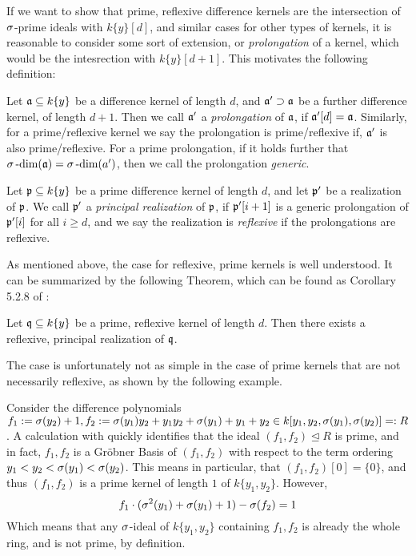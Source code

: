 If we want to show that prime, reflexive difference kernels are the intersection of $\sigma$-prime ideals with $k\{y\}[d]$, and similar cases for other types of kernels,
it is reasonable to consider some sort of extension, or \emph{prolongation} of a kernel, which would be the intesrection with $k\{y\}[d+1]$.  
This motivates the following definition: 

\begin{defn}
Let $\mathfrak{a} \subseteq k\{y\}$ be a difference kernel of length $d$, and $\mathfrak{a}' \supset \mathfrak{a}$ be a further difference kernel, of length $d+1$.
Then we call $\mathfrak{a}'$ a \emph{prolongation} of $\mathfrak{a}$, if $\mathfrak{a}'[d] = \mathfrak{a}$. Similarly, for a prime/reflexive kernel we say the prolongation is prime/reflexive if, $\mathfrak{a}'$ is also prime/reflexive.
For a prime prolongation, if it holds further that $\sigma\operatorname{-dim}(\mathfrak{a}) = \sigma\operatorname{-dim}(a')$, then we call the prolongation \emph{generic}.
\end{defn}

\begin{defn}
Let $\mathfrak{p} \subseteq k\{y\}$ be a prime difference kernel of length $d$, and let $\mathfrak{p}'$ be a realization of $\mathfrak{p}$. We call $\mathfrak{p}'$ a \emph{principal realization} of $\mathfrak{p}$, if $\mathfrak{p}'[i+1]$ is a generic prolongation of $\mathfrak{p}'[i]$ for all $i \geq d$,
and we say the realization is \emph{reflexive} if the prolongations are reflexive.  
\end{defn}

As mentioned above, the case for reflexive, prime kernels is well understood. It can be summarized by the following Theorem, which can be found as Corollary 5.2.8 of \cite{wibmer}:
\begin{theorem}
Let $\mathfrak{q} \subseteq k\{y\}$ be a prime, reflexive kernel of length $d$. Then there exists a reflexive, principal realization of $\mathfrak{q}$. 
\end{theorem}

The case is unfortunately not as simple in the case of prime kernels that are not necessarily reflexive, as shown by the following example.

\begin{ex}\label{counterexker}
Consider the difference polynomials $f_1 := \sigma(y_2) + 1, f_2:= \sigma(y_1)y_2 + y_1y_2 + \sigma(y_1) + y_1 + y_2 \in k[y_1,y_2,\sigma(y_1),\sigma(y_2)] =: R$.
A calculation with \cite{M2} quickly identifies that the ideal $(f_1,f_2) \unlhd R$ is prime, and in fact, $f_1,f_2$ is a Gr\"{o}bner Basis of $(f_1,f_2)$ with respect to the
term ordering $y_1 < y_2 < \sigma(y_1) < \sigma(y_2)$. This means in particular, that $(f_1,f_2)[0] = \{0\}$, and thus $(f_1,f_2)$ is a prime kernel of length $1$ of $k\{y_1,y_2\}$. However,
\[ f_1 \cdot (\sigma^2(y_1) + \sigma(y_1) + 1 ) - \sigma(f_2) = 1 \]
Which means that any $\sigma$-ideal of $k\{y_1,y_2\}$ containing $f_1, f_2$ is already the whole ring, and is not prime, by definition.
\end{ex}

